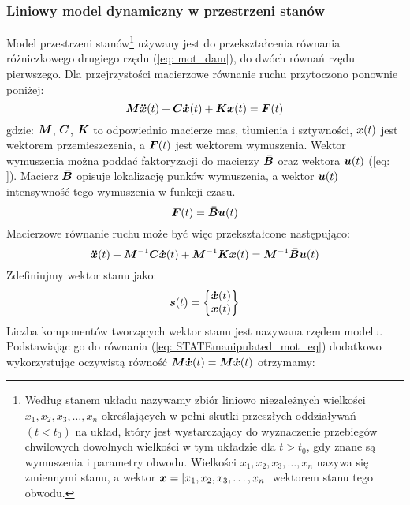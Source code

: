 \subsubsection{Liniowy model dynamiczny w przestrzeni stanów}
Model przestrzeni stanów\footnote{Według \cite{Kaczorek2016} stanem układu nazywamy zbiór liniowo niezależnych wielkości $x_1, x_2, x_3,\dots,x_n$ określających w pełni skutki przeszłych oddziaływań $(t<t_0)$ na układ, który jest wystarczający do wyznaczenie przebiegów chwilowych dowolnych wielkości w tym układzie dla $t>t_0$, gdy znane są wymuszenia i parametry obwodu. Wielkości $x_1, x_2, x_3,\dots,x_n$ nazywa się zmiennymi stanu, a wektor $\bm{x}=[x_1, x_2, x_3,\dots,x_n]$ wektorem stanu tego obwodu.}  używany jest do przekształcenia równania różniczkowego drugiego rzędu (\ref{eq: mot_dam}), do dwóch równań rzędu pierwszego.     Dla przejrzystości macierzowe równanie ruchu przytoczono ponownie poniżej:
\begin{equation}
	\bm{M} \bm{\ddot{x}}(t) +\bm{C} \bm{\dot{x}}(t)+ \bm{Kx}(t) = \bm{F}(t)
\end{equation}
gdzie: $\bm{M}$, $\bm{C}$, $\bm{K}$ to odpowiednio macierze mas, tłumienia i sztywności, $\bm{x}(t)$ jest wektorem przemieszczenia, a $\bm{F}(t)$ jest wektorem wymuszenia. 
Wektor wymuszenia można poddać faktoryzacji do macierzy $\bm{\bar{B}}$ oraz wektora $\bm{u}(t)$ (\ref{eq: }). Macierz $\bm{\bar{B}}$ opisuje lokalizację punków wymuszenia, a wektor $\bm{u}(t)$ intensywność tego wymuszenia w funkcji czasu.
\begin{equation}
	\bm{F}(t) = \bm{\bar{B}}\bm{u}(t)
\end{equation} 
Macierzowe równanie ruchu może być więc przekształcone następująco:
\begin{equation} \label{eq: STATEmanipulated_mot_eq}
	\bm{\ddot{x}}(t) +\bm{M}^{-1} \bm{C} \bm{\dot{x}}(t)+ \bm{M}^{-1}\bm{Kx}(t) = \bm{M}^{-1}\bm{\bar{B}}\bm{u}(t)
\end{equation}
Zdefiniujmy wektor stanu jako:
\begin{equation} \label{eq: stateVector}
	\bm{s}(t) = \begin{Bmatrix}
		\bm{\dot{x}}(t) \\
		\bm{x}(t)
	\end{Bmatrix}
\end{equation}
Liczba komponentów tworzących wektor stanu jest nazywana rzędem modelu. Podstawiając go do równania (\ref{eq: STATEmanipulated_mot_eq}) dodatkowo wykorzystując oczywistą równość $\bm{M}\bm{\dot{x}}(t)=\bm{M}\bm{\dot{x}}(t)$ otrzymamy:
